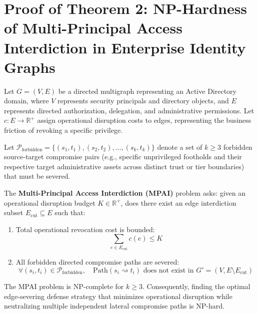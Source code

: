\section[Proof of Theorem 2: NP-Hardness of Multi-Principal Access Interdiction]{Proof of Theorem 2: NP-Hardness of Multi-Principal Access Interdiction in Enterprise Identity Graphs}
\label{proof:theorem2}

\begin{theorem}
Let $G = (V, E)$ be a directed multigraph representing an Active Directory domain, where $V$ represents security principals and directory objects, and $E$ represents directed authorization, delegation, and administrative permissions. Let $c: E \to \mathbb{R}^+$ assign operational disruption costs to edges, representing the business friction of revoking a specific privilege.

Let $\mathcal{P}_{\text{forbidden}} = \{(s_1, t_1), (s_2, t_2), \dots, (s_k, t_k)\}$ denote a set of $k \ge 3$ forbidden source-target compromise pairs (e.g., specific unprivileged footholds and their respective target administrative assets across distinct trust or tier boundaries) that must be severed.

The \textbf{Multi-Principal Access Interdiction (MPAI)} problem asks: given an operational disruption budget $K \in \mathbb{R}^+$, does there exist an edge interdiction subset $E_{\text{cut}} \subseteq E$ such that:
\begin{enumerate}
    \item Total operational revocation cost is bounded:
    \begin{equation}
    \sum_{e \in E_{\text{cut}}} c(e) \le K
    \end{equation}
    \item All forbidden directed compromise paths are severed:
    \begin{equation}
    \forall (s_i, t_i) \in \mathcal{P}_{\text{forbidden}}, \quad \text{Path}(s_i \rightsquigarrow t_i) \text{ does not exist in } G' = (V, E \setminus E_{\text{cut}})
    \end{equation}
\end{enumerate}
The MPAI problem is NP-complete for $k \ge 3$. Consequently, finding the optimal edge-severing defense strategy that minimizes operational disruption while neutralizing multiple independent lateral compromise paths is NP-hard.
\end{theorem}

